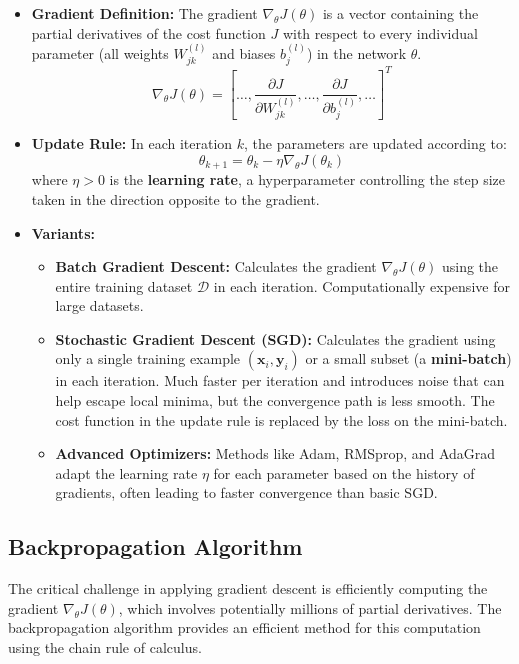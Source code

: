 \documentclass[11pt,twoside,openright]{report}
\begin{document}
\begin{itemize}
    \item \textbf{Gradient Definition:} The gradient $\nabla_\theta J(\theta)$ is a vector containing the partial derivatives of the cost function $J$ with respect to every individual parameter (all weights $W_{jk}^{(l)}$ and biases $b_j^{(l)}$) in the network $\theta$.
        $$ \nabla_\theta J(\theta) = \left[ \dots, \frac{\partial J}{\partial W_{jk}^{(l)}}, \dots, \frac{\partial J}{\partial b_j^{(l)}}, \dots \right]^T $$

    \item \textbf{Update Rule:} In each iteration $k$, the parameters are updated according to:
        \begin{equation} \label{eq:gd_update}
            \theta_{k+1} = \theta_k - \eta \nabla_\theta J(\theta_k)
        \end{equation}
        where $\eta > 0$ is the \textbf{learning rate}, a hyperparameter controlling the step size taken in the direction opposite to the gradient.

    \item \textbf{Variants:}
        \begin{itemize}
            \item \textbf{Batch Gradient Descent:} Calculates the gradient $\nabla_\theta J(\theta)$ using the entire training dataset $\mathcal{D}$ in each iteration. Computationally expensive for large datasets.
            \item \textbf{Stochastic Gradient Descent (SGD):} Calculates the gradient using only a single training example $(\mathbf{x}_i, \mathbf{y}_i)$ or a small subset (a \textbf{mini-batch}) in each iteration. Much faster per iteration and introduces noise that can help escape local minima, but the convergence path is less smooth. The cost function in the update rule is replaced by the loss on the mini-batch.
            \item \textbf{Advanced Optimizers:} Methods like Adam, RMSprop, and AdaGrad adapt the learning rate $\eta$ for each parameter based on the history of gradients, often leading to faster convergence than basic SGD.
        \end{itemize}
\end{itemize}

\subsection{Backpropagation Algorithm}
The critical challenge in applying gradient descent is efficiently computing the gradient $\nabla_\theta J(\theta)$, which involves potentially millions of partial derivatives. The backpropagation algorithm provides an efficient method for this computation using the chain rule of calculus.
\end{document}
